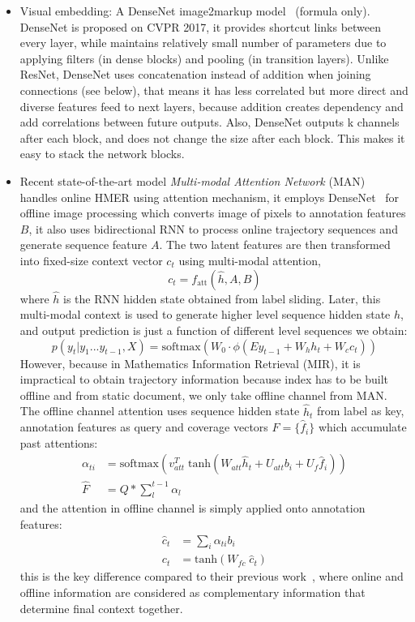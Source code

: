 \documentclass[11pt]{artikel3}
\begin{document}
\begin{itemize}
\begin{itemize}
    \item Visual embedding: A DenseNet image2markup model~\cite{zhang2017watch, yasunaga2019topiceq} (formula only). DenseNet is proposed on CVPR 2017, it provides shortcut links between every layer, while maintains relatively small number of parameters due to applying filters (in dense blocks) and pooling (in transition layers).
Unlike ResNet, DenseNet uses concatenation instead of addition when joining connections (see below), that means it has less correlated but more direct and diverse features feed to next layers, because addition creates dependency and add correlations between future outputs.
Also, DenseNet outputs k channels after each block, and does not change the size after each block. This makes it easy to stack the network blocks.

	\item Recent state-of-the-art model \textit{Multi-modal Attention Network} (MAN) ~\cite{wang2019multi} handles online HMER using attention mechanism, it employs DenseNet~\cite{huang2017densely} for offline image processing which converts image of pixels to annotation features $B$, it also uses bidirectional RNN to process online trajectory sequences and generate sequence feature $A$. 
The two latent features are then transformed into fixed-size context vector $c_t$ using multi-modal attention,
$$
c_t = f_{\mathrm{att}}(\hat h, A, B)
$$
where $\hat h$ is the RNN hidden state obtained from label sliding. Later, this multi-modal context is used to generate higher level sequence hidden state $h$, and output prediction is just a function of different level sequences we obtain:
$$
p(y_t|y_1 ... y_{t-1}, X) = \mathrm{softmax}(W_0 \cdot \phi(E y_{t-1} + W_h h_t + W_c c_t))
$$
However, because in Mathematics Information Retrieval (MIR), it is impractical to obtain trajectory information because index has to be built offline and from static document, we only take offline channel from MAN.
The offline channel attention uses sequence hidden state $\hat h_t$ from label as key, annotation features as query and coverage vectors $F = \{\hat f_i\}$ which accumulate past attentions:
$$
\begin{aligned}
\alpha_{ti} &= \mathrm{softmax}(v_{att}^T \; \mathrm{tanh} (W_{att} \hat{h}_t + U_{att} b_i + U_{f} \hat f_i)) \\
\hat F &= Q * \sum^{t-1}_l \alpha_{l}
\end{aligned}
$$
and the attention in offline channel is simply applied onto annotation features:
$$
\begin{aligned}
\hat c_t &= \sum_{i} \alpha_{ti} b_i \\
c_t &= \mathrm{tanh} (W_{fc} \; \hat c_t)
\end{aligned}
$$
this is the key difference compared to their previous work~\cite{zhang2017gru}, where online and offline information are considered as complementary information that determine final context together.



\end{itemize}
\end{itemize}
\end{document}
